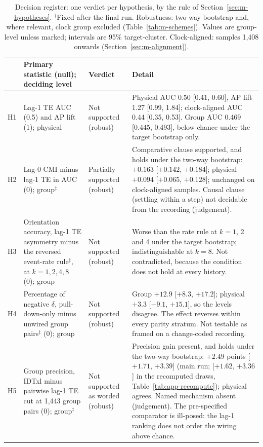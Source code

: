 \begin{table}[tbp]
  \centering
  \footnotesize
  \setlength{\tabcolsep}{4pt}
  \caption[Decision register]{Decision register: one verdict per hypothesis, by the rule of Section~\ref{sec:m-hypotheses}. $^{\ddagger}$Fixed after the final run. Robustness: two-way bootstrap and, where relevant, clock group excluded (Table~\ref{tab:m-schemes}). Values are group-level unless marked; intervals are 95\% target-cluster. Clock-aligned: samples 1,408 onwards (Section~\ref{sec:m-alignment}).}
  \label{tab:m-register}
  \begin{tabular}{@{}lL{0.24\textwidth}L{0.17\textwidth}L{0.47\textwidth}@{}}
    \toprule
    & Primary statistic (null); deciding level & Verdict & Detail \\
    \midrule
    H1 & Lag-1 TE AUC (0.5) and AP lift (1); physical & Not supported (robust) & Physical AUC 0.50 [0.41, 0.60], AP lift 1.27 [0.99, 1.84]; clock-aligned AUC 0.44 [0.35, 0.53]. Group AUC 0.469 [0.445, 0.493], below chance under the target bootstrap only. \\
    \addlinespace
    H2 & Lag-0 CMI minus lag-1 TE in AUC (0); group$^{\ddagger}$ & Partially supported (robust) & Comparative clause supported, and holds under the two-way bootstrap: $+0.163$ [$+0.142$, $+0.184$]; physical $+0.094$ [$+0.065$, $+0.128$]; unchanged on clock-aligned samples. Causal clause (settling within a step) not decidable from the recording (judgement). \\
    \addlinespace
    H3 & Orientation accuracy, lag-1 TE asymmetry minus the reversed event-rate rule$^{\ddagger}$, at $k = 1, 2, 4, 8$ (0); group & Not supported (robust) & Worse than the rate rule at $k = 1$, 2 and 4 under the target bootstrap; indistinguishable at $k = 8$. Not contradicted, because the condition does not hold at every history. \\
    \addlinespace
    H4 & Percentage of negative $\delta$, pull-down-only minus unwired group pairs$^{\ddagger}$ (0); group & Not supported (robust) & Group $+12.9$ [$+8.3$, $+17.2$]; physical $+3.3$ [$-9.1$, $+15.1$], so the levels disagree. The effect reverses within every parity stratum. Not testable as framed on a change-coded recording. \\
    \addlinespace
    H5 & Group precision, IDTxl minus pairwise lag-1 TE cut at 1,443 group pairs (0); group$^{\ddagger}$ & Not supported as worded (robust) & Precision gain present, and holds under the two-way bootstrap: $+2.49$ points [$+1.71$, $+3.39$] (main run; [$+1.62$, $+3.36$] in the recomputed draws, Table~\ref{tab:app-recompute}); physical agrees. Named mechanism absent (judgement). The pre-specified comparator is ill-posed: the lag-1 ranking does not order the wiring above chance. \\

\end{tabular}
\end{table}
